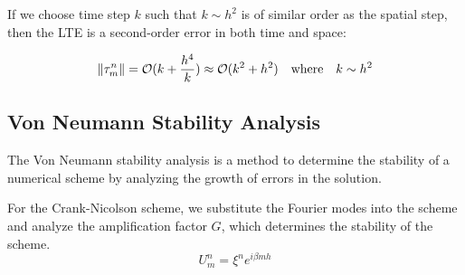 If we choose time step \(k\) such that \(k \sim h^2\) is of similar order as the spatial step, then the LTE is a second-order error in both time and space:

\begin{equation}
  \lVert\tau_m^n\rVert = \mathcal{O}(k + \frac{h^4}{k}) \approx \mathcal{O}(k^2 + h^2) \quad \text{where} \quad k \sim h^2
\end{equation}




\subsection{Von Neumann Stability Analysis}
The Von Neumann stability analysis is a method to determine the stability of a numerical scheme by analyzing the growth of errors in the solution.

For the Crank-Nicolson scheme, we substitute the Fourier modes into the scheme and analyze the amplification factor \(G\), which determines the stability of the scheme.
\[
  U_m^n = \xi^n e^{i \beta m h}
\]

